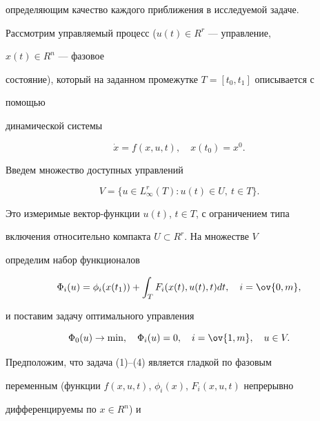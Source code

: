 определяющим качество каждого приближения в исследуемой задаче. 


 


Рассмотрим управляемый процесс ($u(t)\in R^r$ --- управление, 


$x(t)\in R^n$ --- фазовое 


состояние), который на заданном промежутке $T=[t_0,t_1]$ описывается с 


помощью 


динамической системы 


\begin{equation} 


\Dot x=f(x,u,t),\quad x(t_0)=x^0. 


\end{equation} 


Введем множество доступных управлений 


\begin{equation} 


V=\{u\in L^r_\infty(T):u(t)\in U,\ t\in T\}. 


\end{equation} 


Это измеримые вектор-функции $u(t)$, $t\in T$, с ограничением типа 


включения относительно компакта $U\subset R^r$. На множестве $V$ 


определим набор функционалов 


\begin{equation} 


\Phi_i(u)=\phi_i(x(t_1))+\int_T F_i(x(t),u(t),t)dt,\quad 


i=\ov{0,m}, 


\end{equation} 


и поставим задачу оптимального управления 


\begin{equation} 


\Phi_0(u)\to \min,\quad \Phi_i(u)=0,\quad 


i=\ov{1,m},\quad u\in V. 


\end{equation} 


Предположим, что задача (1)--(4) является гладкой по фазовым 


переменным (функции $f(x,u,t)$, $\phi_i(x)$, $F_i(x,u,t)$ непрерывно 


дифференцируемы по $x\in R^n$) и 


